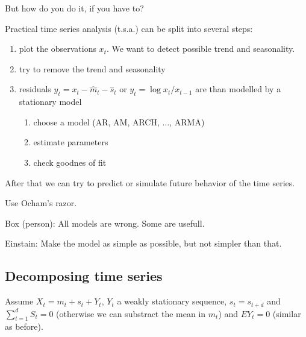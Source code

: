 \documentclass[12pt,a4paper]{amsart}
\theoremstyle{definition} %
\theoremstyle{plain} %
\begin{document}
But how do you do it, if you have to?

Practical time series analysis (t.s.a.) can be split into several steps:
\begin{enumerate}
\item plot the observations $x_t$. We want to detect possible trend and seasonality. 
\item try to remove the trend and seasonality
\item residuals $y_t = x_t - \hat{m}_t - \hat{s}_t$ or $y_t = \log{x_t / x_{t-1}}$ are than modelled  by a stationary model
\begin{enumerate}
\item choose a model (AR, AM, ARCH, $\dots$, ARMA)
\item estimate parameters
\item check goodnes of fit
\end{enumerate}
\end{enumerate}
After that we can try to predict or simulate future behavior of the time series.

Use Ocham's razor.

Box (person): All models are wrong. Some are usefull.

Einstain: Make the model as simple as possible, but not simpler than that.

\subsection{Decomposing time series}

\vskip1cm


Assume $X_t = m_t + s_t + Y_t$, $Y_t$ a weakly stationary sequence, $s_t = s_{t+d}$ and $\sum_{t=1}^d S_t = 0$ (otherwise we can substract the mean in $m_t$) and $E Y_t = 0$ (similar as before). 
\end{document}
